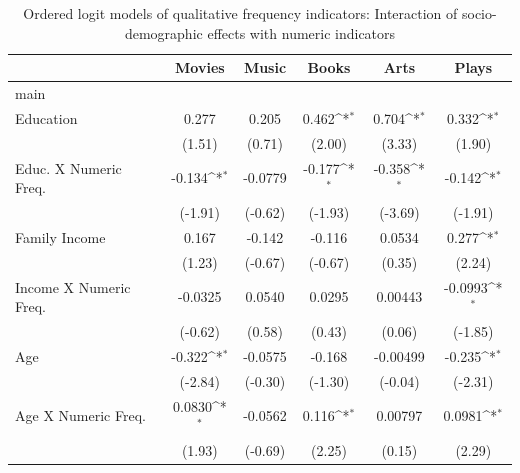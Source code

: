 {
\def\sym#1{\ifmmode^{#1}\else\(^{#1}\)\fi}
\begin{longtable}{l*{5}{c}}
\caption{Ordered logit models of qualitative frequency indicators: Interaction of socio-demographic effects with numeric indicators\label{tab:vague}}\\
\toprule\endfirsthead\midrule\endhead\midrule\endfoot\endlastfoot
                    &\multicolumn{1}{c}{Movies}&\multicolumn{1}{c}{Music}&\multicolumn{1}{c}{Books}&\multicolumn{1}{c}{Arts}&\multicolumn{1}{c}{Plays}\\
\midrule
main                &                   &                   &                   &                   &                   \\
Education           &       0.277       &       0.205       &       0.462\sym{*}&       0.704\sym{*}&       0.332\sym{*}\\
                    &      (1.51)       &      (0.71)       &      (2.00)       &      (3.33)       &      (1.90)       \\
Educ. X Numeric Freq.&      -0.134\sym{*}&     -0.0779       &      -0.177\sym{*}&      -0.358\sym{*}&      -0.142\sym{*}\\
                    &     (-1.91)       &     (-0.62)       &     (-1.93)       &     (-3.69)       &     (-1.91)       \\
Family Income       &       0.167       &      -0.142       &      -0.116       &      0.0534       &       0.277\sym{*}\\
                    &      (1.23)       &     (-0.67)       &     (-0.67)       &      (0.35)       &      (2.24)       \\
Income X Numeric Freq.&     -0.0325       &      0.0540       &      0.0295       &     0.00443       &     -0.0993\sym{*}\\
                    &     (-0.62)       &      (0.58)       &      (0.43)       &      (0.06)       &     (-1.85)       \\
Age                 &      -0.322\sym{*}&     -0.0575       &      -0.168       &    -0.00499       &      -0.235\sym{*}\\
                    &     (-2.84)       &     (-0.30)       &     (-1.30)       &     (-0.04)       &     (-2.31)       \\
Age X Numeric Freq. &      0.0830\sym{*}&     -0.0562       &       0.116\sym{*}&     0.00797       &      0.0981\sym{*}\\
                    &      (1.93)       &     (-0.69)       &      (2.25)       &      (0.15)       &      (2.29)       \\

\end{longtable}}
